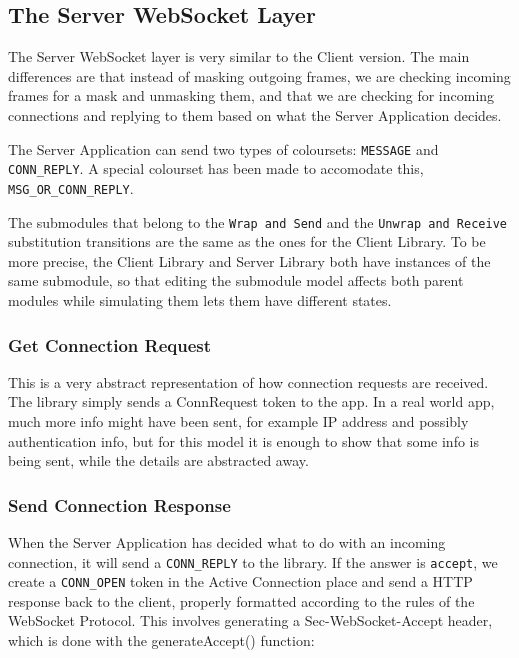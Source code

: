 \subsection{The Server WebSocket Layer}
	
	
	The Server WebSocket layer is very similar to the Client version. The main
	differences are that instead of masking outgoing frames, we are checking
	incoming frames for a mask and unmasking them, and that we are checking for
	incoming connections and replying to them based on what the Server Application
	decides.
	
	The Server Application can send two types of coloursets: \lstinline:MESSAGE: and
	\lstinline:CONN_REPLY:. A special colourset has been made to accomodate this,
	\lstinline:MSG_OR_CONN_REPLY:. 
	
	The submodules that belong to the \lstinline:Wrap and Send: and the
	\lstinline:Unwrap and Receive: substitution transitions are the same as the ones for the Client Library. To
	be more precise, the Client Library and Server Library both have instances of
	the same submodule, so that editing the submodule model affects both parent
	modules while simulating them lets them have different states.
	
	\subsubsection{Get Connection Request}
		
		
		This is a very abstract representation of how connection requests are
		received. The library simply sends a ConnRequest token to the app. In a real
		world app, much more info might have been sent, for example IP address and
		possibly authentication info, but for this model it is enough to show that
		some info is being sent, while the details are abstracted away. 

	\subsubsection{Send Connection Response}
		
		
		When the Server Application has decided what to do with an incoming
		connection, it will send a \lstinline:CONN_REPLY: to the library. If the
		answer is \lstinline:accept:, we create a \lstinline:CONN_OPEN: token in the
		Active Connection place and send a HTTP response back to the client, properly
		formatted according to the rules of the WebSocket Protocol. This involves
		generating a Sec-WebSocket-Accept header, which is done with the
		generateAccept() function:
		
